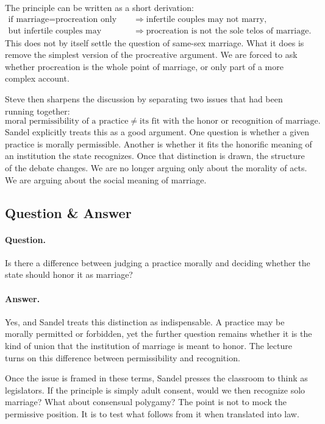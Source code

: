 The principle can be written as a short derivation:
\begin{align}
\text{if } \text{marriage}=\text{procreation only}
&\Longrightarrow
\text{infertile couples may not marry},\\
\text{but infertile couples may marry}
&\Longrightarrow
\text{procreation is not the sole telos of marriage}.
\end{align}
This does not by itself settle the question of same-sex marriage. What it does is remove the simplest version of the procreative argument. We are forced to ask whether procreation is the whole point of marriage, or only part of a more complex account.

Steve then sharpens the discussion by separating two issues that had been running together:
\begin{equation}
\text{moral permissibility of a practice}
\neq
\text{its fit with the honor or recognition of marriage}.
\end{equation}
Sandel explicitly treats this as a good argument. One question is whether a given practice is morally permissible. Another is whether it fits the honorific meaning of an institution the state recognizes. Once that distinction is drawn, the structure of the debate changes. We are no longer arguing only about the morality of acts. We are arguing about the social meaning of marriage.

\subsection{Question \& Answer}

\paragraph{Question.} Is there a difference between judging a practice morally and deciding whether the state should honor it as marriage?

\paragraph{Answer.} Yes, and Sandel treats this distinction as indispensable. A practice may be morally permitted or forbidden, yet the further question remains whether it is the kind of union that the institution of marriage is meant to honor. The lecture turns on this difference between permissibility and recognition.

Once the issue is framed in these terms, Sandel presses the classroom to think as legislators. If the principle is simply adult consent, would we then recognize solo marriage? What about consensual polygamy? The point is not to mock the permissive position. It is to test what follows from it when translated into law.

